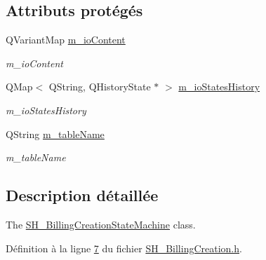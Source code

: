 \subsection*{Attributs protégés}
\begin{DoxyCompactItemize}
\item 
Q\-Variant\-Map \hyperlink{classSH__InOutStateMachine_a661a1c7bd3b1086b3b5cd60ca957ecbd}{m\-\_\-io\-Content}
\begin{DoxyCompactList}\small\item\em m\-\_\-io\-Content \end{DoxyCompactList}\item 
Q\-Map$<$ Q\-String, Q\-History\-State $\ast$ $>$ \hyperlink{classSH__InOutStateMachine_aaca2ea542b3f5b4cd238396b07492455}{m\-\_\-io\-States\-History}
\begin{DoxyCompactList}\small\item\em m\-\_\-io\-States\-History \end{DoxyCompactList}\item 
Q\-String \hyperlink{classSH__InOutStateMachine_acc0f5d5133af2dcca30939f53ec8837b}{m\-\_\-table\-Name}
\begin{DoxyCompactList}\small\item\em m\-\_\-table\-Name \end{DoxyCompactList}\end{DoxyCompactItemize}


\subsection{Description détaillée}
The \hyperlink{classSH__BillingCreationStateMachine}{S\-H\-\_\-\-Billing\-Creation\-State\-Machine} class. 

Définition à la ligne \hyperlink{SH__BillingCreation_8h_source_l00007}{7} du fichier \hyperlink{SH__BillingCreation_8h_source}{S\-H\-\_\-\-Billing\-Creation.\-h}.



